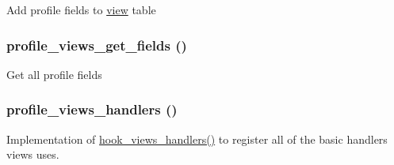 Add profile fields to \hyperlink{classview}{view} table \hypertarget{group__views__profile__module_g8bf1ee086c336dadb69e8fe8728f17f0}{
\subsubsection[{profile\_\-views\_\-get\_\-fields}]{\setlength{\rightskip}{0pt plus 5cm}profile\_\-views\_\-get\_\-fields ()}}
\label{group__views__profile__module_g8bf1ee086c336dadb69e8fe8728f17f0}


Get all profile fields \hypertarget{group__views__profile__module_g64024760f0192ab4df583fa16da18b4d}{
\subsubsection[{profile\_\-views\_\-handlers}]{\setlength{\rightskip}{0pt plus 5cm}profile\_\-views\_\-handlers ()}}
\label{group__views__profile__module_g64024760f0192ab4df583fa16da18b4d}


Implementation of \hyperlink{group__views__hooks_gbf506f44bd8d8a86876f27396f5341ed}{hook\_\-views\_\-handlers()} to register all of the basic handlers views uses. 